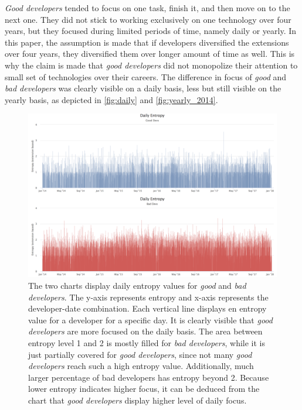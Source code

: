 \textit{Good developers} tended to focus on one task, finish it, and then move on to the next one. They did not stick to working exclusively on one technology over four years, but they focused during limited periods of time, namely daily or yearly. In this paper, the assumption is made that if developers diversified the extensions over four years, they diversified them over longer amount of time as well. This is why the claim is made that \textit{good developers} did not monopolize their attention to small set of technologies over their careers. The difference in focus of \textit{good} and \textit{bad developers} was clearly visible on a daily basis, less but still visible on the yearly basis, as depicted in \autoref{fig:daily} and \autoref{fig:yearly_2014}.

\begin{figure}[htpb]
  \centering
  \includegraphics[width=1\textwidth]{figures/daily}
  \caption[Daily Focus Chart]{The two charts display daily entropy values for \textit{good} and \textit{bad developers}. The y-axis represents entropy and x-axis represents the developer-date combination. Each vertical line displays en entropy value for a developer for a specific day. It is clearly visible that \textit{good developers} are more focused on the daily basis. The area between entropy level 1 and 2 is mostly filled for \textit{bad developers}, while it is just partially covered for \textit{good developers}, since not many \textit{good developers} reach such a high entropy value. Additionally, much larger percentage of bad developers has entropy beyond 2. Because lower entropy indicates higher focus, it can be deduced from the chart that \textit{good developers} display higher level of daily focus.} \label{fig:daily}
\end{figure}

